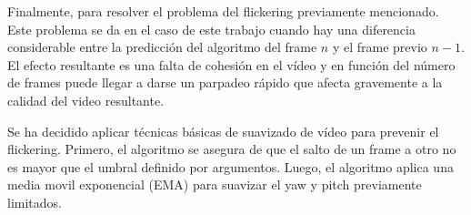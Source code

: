 
Finalmente, para resolver el problema del flickering previamente mencionado. Este problema se da en el caso de este trabajo cuando hay una diferencia considerable entre la predicción del algoritmo del frame $n$ y el frame previo $n-1$. El efecto resultante es una falta de cohesión en el vídeo y en función del número de frames puede llegar a darse un parpadeo rápido que afecta gravemente a la calidad del video resultante. 

Se ha decidido aplicar técnicas básicas de suavizado de vídeo para prevenir el flickering. Primero, el algoritmo se asegura de que el salto de un frame a otro no es mayor que el umbral definido por argumentos. Luego, el algoritmo aplica una media movil exponencial (EMA) para suavizar el yaw y pitch previamente limitados.

